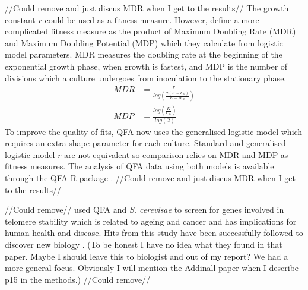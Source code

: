 //Could remove and just discus MDR when I get to the results//
The growth constant \(r\) could be used as a fitness measure. However,
\citet{Addinall2011} define a more complicated fitness measure as the
product of Maximum Doubling Rate (MDR) and Maximum Doubling Potential
(MDP) which they calculate from logistic model parameters. MDR measures
the doubling rate at the beginning of the exponential growth phase,
when growth is fastest, and MDP is the number of divisions which a
culture undergoes from inoculation to the stationary phase.
%
\begin{subequations}
  \label{eq:MDR_MDP}
    \begin{align}
      MDR &= \frac{r}{log\left(\frac{2(K-C_0)}{K-2C_0}\right)}\\
      MDP &= \frac{log\left(\frac{K}{C_0}\right)}{log(2)}
    \end{align}
\end{subequations}
%
To improve the quality of fits, QFA now uses the generalised logistic
model which requires an extra shape parameter for each
culture. Standard and generalised logistic model \(r\) are not
equivalent so comparison relies on MDR and MDP as fitness
measures. The analysis of QFA data using both models is available
through the QFA R package \citep{qfa2016}.  //Could remove and just
discus MDR when I get to the results//


//Could remove//\citet{Addinall2011} used QFA and
\textit{S. cerevisae} to screen for genes involved in telomere
stability which is related to ageing and cancer and has implications
for human health and disease. Hits from this study have been
successfully followed to discover new biology
\citep{Holstein20141259}. (To be honest I have no idea what they found
in that paper. Maybe I should leave this to biologist and out of my
report? We had a more general focus. Obviously I will mention the
Addinall paper when I describe p15 in the methods.)  //Could remove//


